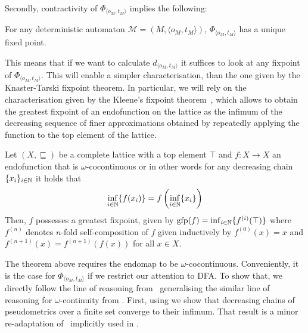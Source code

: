 Secondly, contractivity of $\Phi_{\langle o_M, t_M\rangle}$ implies the following:
\begin{corollary}\label{c2:lem:uniquefp}
    For any deterministic automaton $\mathcal{M} = (M, \langle o_M, t_M\rangle)$, $\Phi_{\langle o_M, t_M\rangle}$ has a unique fixed point.
\end{corollary}
This means that if we want to calculate $d_{\langle o_M, t_M\rangle}$ it suffices to look at any fixpoint of $\Phi_{\langle o_M, t_M\rangle}$. This will enable a simpler characterisation, than the one given by the Knaster-Tarski fixpoint theorem. In particular, we will rely on the characterisation given by the Kleene's fixpoint theorem~\cite[Theorem~2.8.5]{Sangiorgi:2011:Coinduction}, which allows to obtain the greatest fixpoint of an endofunction on the lattice as the infimum of the decreasing sequence of finer approximations obtained by repeatedly applying the function to the top element of the lattice.

\begin{theorem}\label{c2:thm:kleene}
	Let $(X, \sqsubseteq)$ be a complete lattice with a top element $\top$ and $f \colon X \to X$ an endofunction that is $\omega$-cocontinuous or in other words for any decreasing chain $\{x_i\}_{i \in \mathbb{N}}$ it holds that $$\inf_{i \in \mathbb{N}} \{f(x_i)\} = f \left( \inf_{i \in \mathbb{N}} \{ x_i \} \right)$$  
	Then, $f$ possesses a greatest fixpoint, given by 
	$\operatorname{gfp}(f) = \inf_{i \in \mathbb{N} }\{f^{(i)}(\top)\}$
	where $f^{(n)}$ denotes $n$-fold self-composition of $f$ given inductively by $f^{(0)}(x)=x$ and $f^{(n+1)}(x) = f^{(n+1)}(f(x))$ for all $x \in X$.
\end{theorem} 
The theorem above requires the endomap to be $\omega$-cocontinuous. Conveniently, it is the case for $\Phi_{\langle o_M, t_M\rangle}$ if we restrict our attention to \textsf{DFA}. To show that, we directly follow the line of reasoning from~\cite[Lemma~5.6]{Bacci:2018:Bisimilarity} generalising the similar line of reasoning for $\omega$-continuity from \cite[Theorem~1]{Breugel:2012:On}. First, using   we show that decreasing chains of pseudometrics over a finite set converge to their infimum. That result is a minor re-adaptation of~\cite[Theorem~1]{Breugel:2012:On} implicitly used in \cite[Lemma~5.6]{Bacci:2018:Bisimilarity}.

